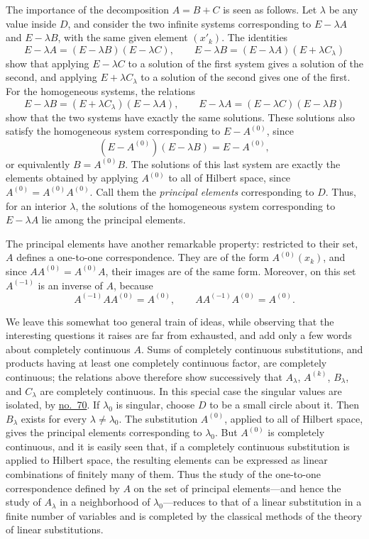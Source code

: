 \documentclass[
  paper=b5,
  fontsize=13pt,
  twoside=true,
  open=any,
  bookmarkpackage=false,
  chapterprefix=true,
  headings=normal
]{scrbook}
\theoremstyle{definition}
\begin{document}
The importance of the decomposition $A=B+C$ is seen as follows. Let
$\lambda$ be any value inside $D$, and consider the two infinite systems
corresponding to $E-\lambda A$ and $E-\lambda B$, with the same given
element $(x'_k)$. The identities
\[
 E-\lambda A=(E-\lambda B)(E-\lambda C),
 \qquad
 E-\lambda B=(E-\lambda A)(E+\lambda C_\lambda)
\]
show that applying $E-\lambda C$ to a solution of the first system gives a
solution of the second, and applying $E+\lambda C_\lambda$ to a solution of
the second gives one of the first. For the homogeneous systems, the
relations
\[
 E-\lambda B=(E+\lambda C_\lambda)(E-\lambda A),
 \qquad
 E-\lambda A=(E-\lambda C)(E-\lambda B)
\]
show that the two systems have exactly the same solutions. These solutions
also satisfy the homogeneous system corresponding to $E-A^{(0)}$, since
\[
 (E-A^{(0)})(E-\lambda B)=E-A^{(0)},
\]
or equivalently $B=A^{(0)}B$. The solutions of this last system are exactly
the elements obtained by applying $A^{(0)}$ to all of Hilbert space, since
$A^{(0)}=A^{(0)}A^{(0)}$. Call them the \emph{principal elements}
corresponding to $D$. Thus, for an interior $\lambda$, the solutions of the
homogeneous system corresponding to $E-\lambda A$ lie among the principal
elements.

The principal elements have another remarkable property: restricted to
their set, $A$ defines a one-to-one correspondence. They are of the form
$A^{(0)}(x_k)$, and since $AA^{(0)}=A^{(0)}A$, their images are of the same
form. Moreover, on this set $A^{(-1)}$ is an inverse of $A$, because
\[
 A^{(-1)}AA^{(0)}=A^{(0)},
 \qquad
 AA^{(-1)}A^{(0)}=A^{(0)}.
\]

We leave this somewhat too general train of ideas, while observing that the
interesting questions it raises are far from exhausted, and add only a few
words about completely continuous $A$. Sums of completely continuous
substitutions, and products having at least one completely continuous
factor, are completely continuous; the relations above therefore show
successively that $A_\lambda$, $A^{(k)}$, $B_\lambda$, and $C_\lambda$ are
completely continuous. In this special case the singular values are
isolated, by \hyperref[sec:70]{no.~70}. If $\lambda_0$ is singular, choose
$D$ to be a small circle about it. Then $B_\lambda$ exists for every
$\lambda\neq\lambda_0$. The substitution $A^{(0)}$, applied to all of
Hilbert space, gives the principal elements corresponding to $\lambda_0$.
But $A^{(0)}$ is completely continuous, and it is easily seen that, if
a completely continuous substitution is applied to Hilbert space, the
resulting elements can be expressed as linear combinations of finitely many of them.
Thus the study of the one-to-one
correspondence defined by \(A\) on the set of principal elements---and hence the
study of \(A_\lambda\) in a neighborhood of \(\lambda_0\)---reduces to that of a
linear substitution in a finite number of variables and is completed by the
classical methods of the theory of linear substitutions.
\end{document}

